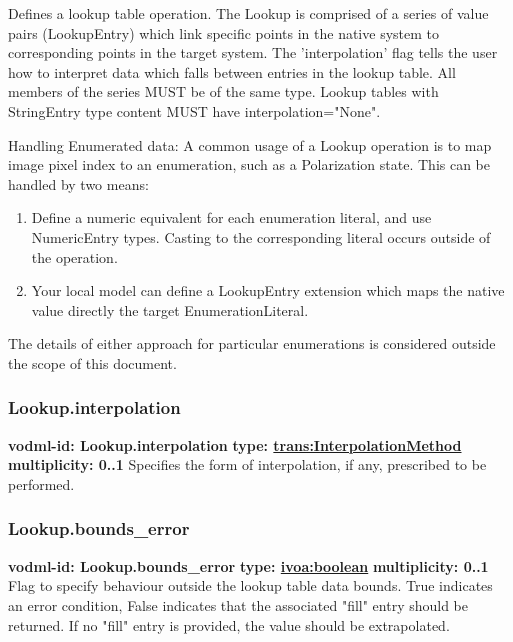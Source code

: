     Defines a lookup table operation. The Lookup is comprised of a series of value pairs (LookupEntry) which link specific points in the native system to corresponding points in the target system. The 'interpolation' flag tells the user how to interpret data which falls between entries in the lookup table. All members of the series MUST be of the same type. Lookup tables with StringEntry type content MUST have interpolation="None". 

    Handling Enumerated data: A common usage of a Lookup operation is to map image pixel index to an enumeration, such as a Polarization state. This can be handled by two means:
    \begin{enumerate}
    \item Define a numeric equivalent for each enumeration literal, and use NumericEntry types. Casting to the corresponding literal occurs outside of the operation. 
    \item Your local model can define a LookupEntry extension which maps the native value directly the target EnumerationLiteral. 
    \end{enumerate}
    The details of either approach for particular enumerations is considered outside the scope of this document.

    \subsubsection{Lookup.interpolation}
      \textbf{vodml-id: Lookup.interpolation} \newline
      \textbf{type: \hyperref[sect:InterpolationMethod]{trans:InterpolationMethod}} \newline
      \textbf{multiplicity: 0..1} \newline 
      Specifies the form of interpolation, if any, prescribed to be performed.

    \subsubsection{Lookup.bounds\_error}
      \textbf{vodml-id: Lookup.bounds\_error} \newline
      \textbf{type: \hyperref[sect:ivoa]{ivoa:boolean}} \newline
      \textbf{multiplicity: 0..1} \newline 
      Flag to specify behaviour outside the lookup table data bounds. True indicates an error condition, False indicates that the associated "fill" entry should be returned. If no "fill" entry is provided, the value should be extrapolated.

